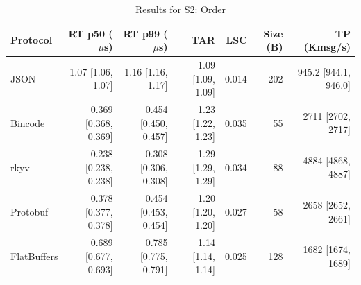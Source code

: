 \begin{table}[htbp]
\centering
\caption{Results for S2: Order}
\label{tab:results_order}
\begin{tabular}{l r r r r r r}
\hline
Protocol & RT p50 ($\mu$s) & RT p99 ($\mu$s) & TAR & LSC & Size (B) & TP (Kmsg/s) \\
\hline
  JSON & 1.07 [1.06, 1.07] & 1.16 [1.16, 1.17] & 1.09 [1.09, 1.09] & 0.014 & 202 & 945.2 [944.1, 946.0] \\
  Bincode & 0.369 [0.368, 0.369] & 0.454 [0.450, 0.457] & 1.23 [1.22, 1.23] & 0.035 & 55 & 2711 [2702, 2717] \\
  rkyv & 0.238 [0.238, 0.238] & 0.308 [0.306, 0.308] & 1.29 [1.29, 1.29] & 0.034 & 88 & 4884 [4868, 4887] \\
  Protobuf & 0.378 [0.377, 0.378] & 0.454 [0.453, 0.454] & 1.20 [1.20, 1.20] & 0.027 & 58 & 2658 [2652, 2661] \\
  FlatBuffers & 0.689 [0.677, 0.693] & 0.785 [0.775, 0.791] & 1.14 [1.14, 1.14] & 0.025 & 128 & 1682 [1674, 1689] \\
\hline
\end{tabular}
\end{table}